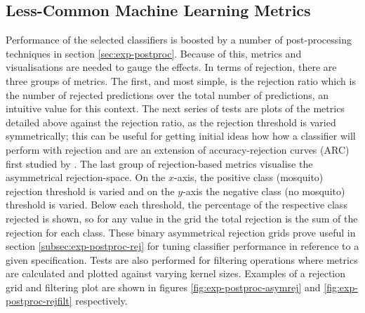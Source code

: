     \subsection{Less-Common Machine Learning Metrics}
    \label{subsec:pl-test-less}
        Performance of the selected classifiers is boosted by a number of post-processing techniques in section \ref{sec:exp-postproc}. Because of this, metrics and visualisations are needed to gauge the effects. In terms of rejection, there are three groups of metrics. The first, and most simple, is the rejection ratio which is the number of rejected predictions over the total number of predictions, an intuitive value for this context. The next series of tests are plots of the metrics detailed above against the rejection ratio, as the rejection threshold is varied symmetrically; this can be useful for getting initial ideas how how a classifier will perform with rejection and are an extension of accuracy-rejection curves (ARC) first studied by \textcite{SajjadAhmedNadeem}. The last group of rejection-based metrics visualise the asymmetrical rejection-space. On the $x$-axis, the positive class (mosquito) rejection threshold is varied and on the $y$-axis the negative class (no mosquito) threshold is varied. Below each threshold, the percentage of the respective class rejected is shown, so for any value in the grid the total rejection is the sum of the rejection for each class. These binary asymmetrical rejection grids prove useful in section \ref{subsec:exp-postproc-rej} for tuning classifier performance in reference to a given specification. Tests are also performed for filtering operations where metrics are calculated and plotted against varying kernel sizes. Examples of a rejection grid and filtering plot are shown in figures \ref{fig:exp-postproc-asymrej} and \ref{fig:exp-postproc-rejfilt} respectively.
    
